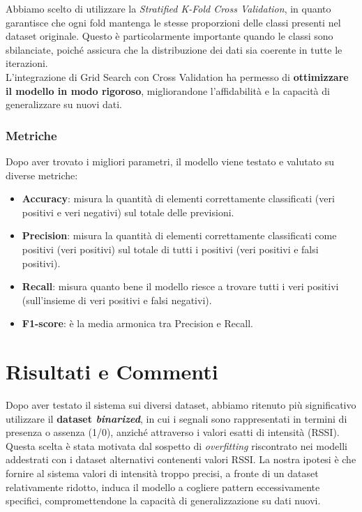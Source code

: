 \documentclass{article}
\begin{document}
Abbiamo scelto di utilizzare la \textit{Stratified K-Fold Cross Validation}, in quanto garantisce che ogni fold mantenga le stesse proporzioni delle classi presenti nel dataset originale. Questo è particolarmente importante quando le classi sono sbilanciate, poiché assicura che la distribuzione dei dati sia coerente in tutte le iterazioni.\\

L'integrazione di Grid Search con Cross Validation ha permesso di \textbf{ottimizzare il modello in modo rigoroso}, migliorandone l'affidabilità e la capacità di generalizzare su nuovi dati.


\subsubsection{Metriche}
Dopo aver trovato i migliori parametri, il modello viene testato e valutato su diverse metriche:
\begin{itemize}
    \item \textbf{Accuracy}: misura la quantità di elementi correttamente classificati (veri positivi e veri negativi) sul totale delle previsioni.
    \item \textbf{Precision}: misura la quantità di elementi correttamente classificati come positivi (veri positivi) sul totale di tutti i positivi (veri positivi e falsi positivi).
    \item \textbf{Recall}: misura quanto bene il modello riesce a trovare tutti i veri positivi (sull'insieme di veri positivi e falsi negativi).
    \item \textbf{F1-score}: è la media armonica tra Precision e Recall.
\end{itemize}


\section{Risultati e Commenti}
Dopo aver testato il sistema sui diversi dataset, abbiamo ritenuto più significativo utilizzare il \textbf{dataset \textit{binarized}}, in cui i segnali sono rappresentati in termini di presenza o assenza (1/0), anziché attraverso i valori esatti di intensità (RSSI).\\

Questa scelta è stata motivata dal sospetto di \textit{overfitting} riscontrato nei modelli addestrati con i dataset alternativi contenenti valori RSSI. La nostra ipotesi è che fornire al sistema valori di intensità troppo precisi, a fronte di un dataset relativamente ridotto, induca il modello a cogliere pattern eccessivamente specifici, compromettendone la capacità di generalizzazione su dati nuovi.\\
\end{document}

